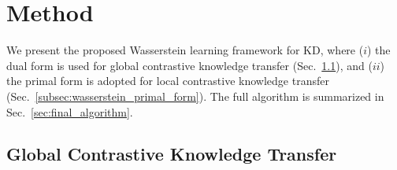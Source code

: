 \documentclass[final]{cvpr}
\theoremstyle{definition}
\begin{document}
\section{Method}




We present the proposed Wasserstein learning framework for KD, where ($i$) the dual form is used for global contrastive knowledge transfer (Sec.~\ref{subsec:wasserstein_dual_form}), and ($ii$) the primal form is adopted for local contrastive knowledge transfer (Sec.~\ref{subsec:wasserstein_primal_form}). The full algorithm is summarized in Sec.~\ref{sec:final_algorithm}.


\subsection{Global Contrastive Knowledge Transfer}\label{subsec:wasserstein_dual_form}
\end{document}
